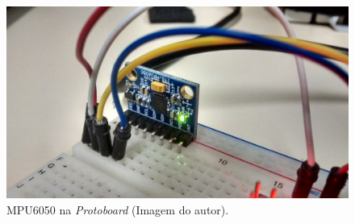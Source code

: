 	 	\begin{figure}[h!]
	 		\centering
	 		\includegraphics[keepaspectratio=true,scale=0.12]{figuras/prototipo2.jpg}
	 		\caption{MPU6050 na \textit{Protoboard} (Imagem do autor).}
	 		
	 		\label{prototipo1_2}	
	 	\end{figure}
	 	
